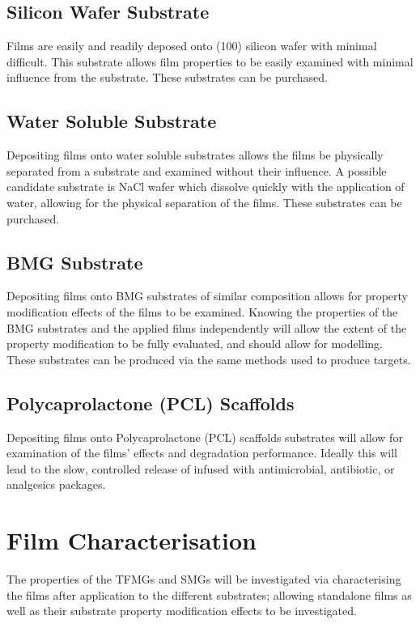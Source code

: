 \documentclass[a4paper,12pt,oneside]{report}%
\begin{document}
\subsection{Silicon Wafer Substrate}
Films are easily and readily deposed onto (100) silicon wafer with minimal difficult. This substrate allows film properties to be easily examined with minimal influence from the substrate. These substrates can be purchased. 

\subsection{Water Soluble Substrate} 
Depositing films onto water soluble substrates allows the films be physically separated from a substrate and examined without their influence. A possible candidate substrate is NaCl wafer which dissolve quickly with the application of water, allowing for the physical separation of the films. These substrates can be purchased. 

\subsection{BMG Substrate}
Depositing films onto BMG substrates of similar composition allows for property modification effects of the films to be examined. Knowing the properties of the BMG substrates and the applied films independently will allow the extent of the property modification to be fully evaluated, and should allow for modelling. These substrates can be produced via the same methods  used to produce targets. 

\subsection{Polycaprolactone (PCL) Scaffolds}
Depositing films onto Polycaprolactone (PCL) scaffolds substrates will allow for examination of the films' effects and degradation performance. Ideally this will lead to the slow, controlled release of infused with antimicrobial, antibiotic, or analgesics packages.

\section{Film Characterisation}
The properties of the TFMGs and SMGs will be investigated via characterising the films after application to the different substrates; allowing standalone films as well as their substrate property modification effects to be investigated. 
\end{document}
